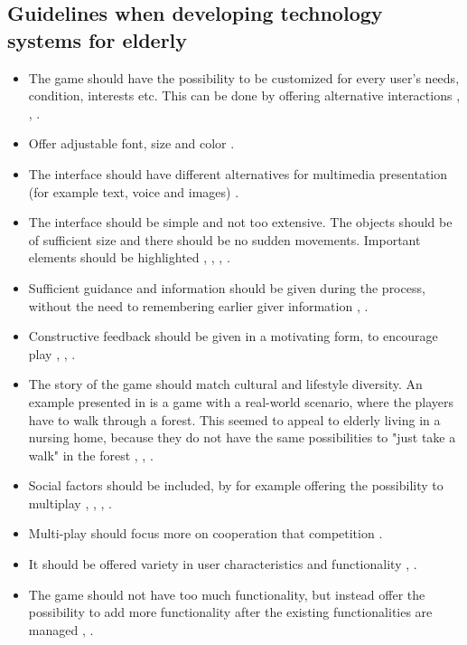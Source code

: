 \subsection{Guidelines when developing technology systems for elderly}
\label{subsec:guidelines}

\begin{itemize}
\renewcommand{\labelitemi}{$\bullet$}
\item The game should have the possibility to be customized for every user's needs, condition, interests etc. This can be done by offering alternative interactions \cite{Billis}, \cite{gregor}, \cite{gerling1}.
\item Offer adjustable font, size and color \cite{Billis}.
\item The interface should have different alternatives for multimedia presentation (for example text, voice and images) \cite{Billis}.
\item The interface should be simple and not too extensive. The objects should be of sufficient size and there should be no sudden movements. Important elements should be highlighted \cite{Billis}, \cite{gerling1}, \cite{gerling2}, \cite{exergamesforelderly}.
\item Sufficient guidance and information should be given during the process, without the need to remembering earlier giver information \cite{Billis}, \cite{gregor}.
\item Constructive feedback should be given in a motivating form, to encourage play \cite{Billis}, \cite{gerling1}, \cite{exergamesforelderly}.
\item The story of the game should match cultural and lifestyle diversity. An example presented in \cite{gerling2} is a game with a real-world scenario, where the players have to walk through a forest. This seemed to appeal to elderly living in a nursing home, because they do not have the same possibilities to "just take a walk" in the forest \cite{Billis}, \cite{gregor}, \cite{gerling2}. 
\item Social factors should be included, by for example offering the possibility to multiplay \cite{Billis}, \cite{gerling2}, \cite{gerling1}, \cite{exergamesforelderly}.
\item Multi-play should focus more on cooperation that competition \cite{Gajadhar}.
\item It should be offered variety in user characteristics and functionality \cite{gregor}, \cite{gerling1}.
\item The game should not have too much functionality, but instead offer the possibility to add more functionality after the existing functionalities are managed \cite{gregor}, \cite{gerling2}.

\end{itemize}
